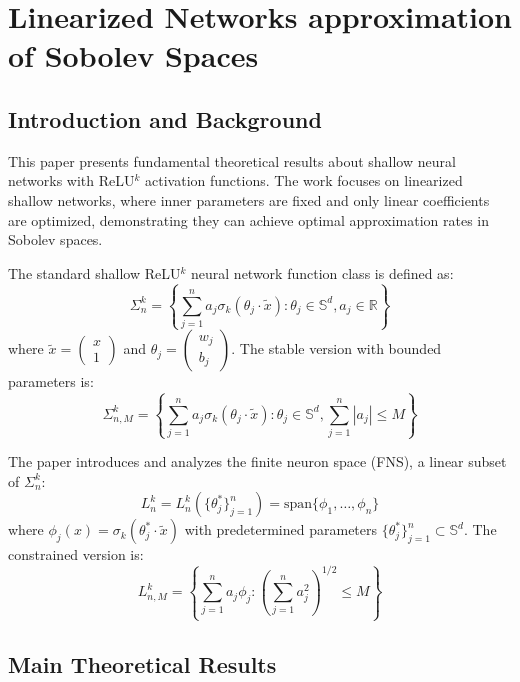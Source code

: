 \documentclass[11pt]{article}
\begin{document}
\section{Linearized Networks approximation of Sobolev Spaces}

\subsection{Introduction and Background}

This paper presents fundamental theoretical results about shallow neural networks with ReLU$^k$ activation functions. The work focuses on linearized shallow networks, where inner parameters are fixed and only linear coefficients are optimized, demonstrating they can achieve optimal approximation rates in Sobolev spaces.

The standard shallow ReLU$^k$ neural network function class is defined as:
\begin{equation}
\Sigma_n^k = \left\{\sum_{j=1}^n a_j \sigma_k(\theta_j \cdot \tilde{x}) : \theta_j \in \mathbb{S}^d, a_j \in \mathbb{R} \right\}
\end{equation}
where $\tilde{x} = \begin{pmatrix} x \\ 1 \end{pmatrix}$ and $\theta_j = \begin{pmatrix} w_j \\ b_j \end{pmatrix}$. The stable version with bounded parameters is:
\begin{equation}
\Sigma_{n,M}^k = \left\{\sum_{j=1}^n a_j \sigma_k(\theta_j \cdot \tilde{x}) : \theta_j \in \mathbb{S}^d, \sum_{j=1}^n |a_j| \leq M \right\}
\end{equation}

The paper introduces and analyzes the finite neuron space (FNS), a linear subset of $\Sigma_n^k$:
\begin{equation}
L_n^k = L_n^k(\{\theta_j^*\}_{j=1}^n) = \text{span} \{\phi_1, \ldots, \phi_n\}
\end{equation}
where $\phi_j(x) = \sigma_k(\theta_j^* \cdot \tilde{x})$ with predetermined parameters $\{\theta_j^*\}_{j=1}^n \subset \mathbb{S}^d$. The constrained version is:
\begin{equation}
L_{n,M}^k = \left\{\sum_{j=1}^n a_j \phi_j : \left(\sum_{j=1}^n a_j^2\right)^{1/2} \leq M \right\}
\end{equation}

\subsection{Main Theoretical Results}
\end{document}

